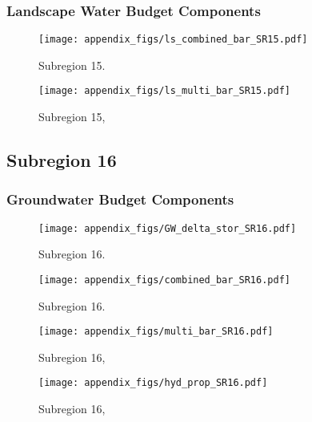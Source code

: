 \subsubsection{Landscape Water Budget Components}
\begin{figure}[ht]
\centerline{\texttt{[image: appendix\_figs/ls\_combined\_bar\_SR15.pdf]}}
\caption{\LSCombinedTextOne Subregion 15.\LSCombinedTextTwo}
\label{fig:LS_budget_SR15}
\end{figure}
\newpage

\begin{landscape}
\begin{figure}[ht]
\centerline{\texttt{[image: appendix\_figs/ls\_multi\_bar\_SR15.pdf]}}
\caption{\LSMultiTextOne Subregion 15,\LSMultiTextTwo}
\label{fig:multi_LS_budget_SR15}
\end{figure}
\newpage
\end{landscape}

\subsection{Subregion 16}
\subsubsection{Groundwater Budget Components}
\begin{figure}[h]
\centerline{\texttt{[image: appendix\_figs/GW\_delta\_stor\_SR16.pdf]}}
\caption{\GWBudgetText Subregion 16.}
\label{fig:delta_stor_SR16}
\end{figure}
\newpage

\begin{figure}[ht]
\centerline{\texttt{[image: appendix\_figs/combined\_bar\_SR16.pdf]}}
\caption{\GWCombinedTextOne Subregion 16.\GWCombinedTextTwo}
\label{fig:GW_budget_SR16}
\end{figure}
\newpage

\begin{landscape}
\begin{figure}[ht]
\centerline{\texttt{[image: appendix\_figs/multi\_bar\_SR16.pdf]}}
\caption{\GWMultiTextOne Subregion 16,\GWMultiTextTwo}
\label{fig:multi_GW_budget_SR16}
\end{figure}
\newpage

\begin{figure}[ht]
\centerline{\texttt{[image: appendix\_figs/hyd\_prop\_SR16.pdf]}}
\caption{\HydPropOne Subregion 16,\HydPropTwo}
\label{fig:hyd_prop_SR16}
\end{figure}
\newpage
\end{landscape}

